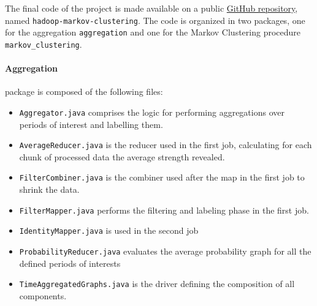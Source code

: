 The final code of the project is made available on a public \href{https://github.com/michele-carignani/hadoop-markov-clustering}{GitHub repository}, \\ 
named \verb!hadoop-markov-clustering!.
The code is organized in two packages, one for the aggregation \texttt{aggregation} and one for the Markov Clustering procedure \texttt{markov\_clustering}.

\paragraph{Aggregation} package is composed of the following files:
\begin{itemize}
\item \texttt{Aggregator.java} comprises the logic for performing aggregations over periods of interest and labelling them.
\item \texttt{AverageReducer.java} is the reducer used in the first job, calculating for each chunk of processed data the average strength revealed.
\item \texttt{FilterCombiner.java} is the combiner used after the map in the first job to shrink the data.
\item \texttt{FilterMapper.java} performs the filtering and labeling phase in the first job.
\item \texttt{IdentityMapper.java} is used in the second job
\item \texttt{ProbabilityReducer.java} evaluates the average probability graph for all the defined periods of interests
\item \texttt{TimeAggregatedGraphs.java} is the driver defining the composition of all components.
\end{itemize}

